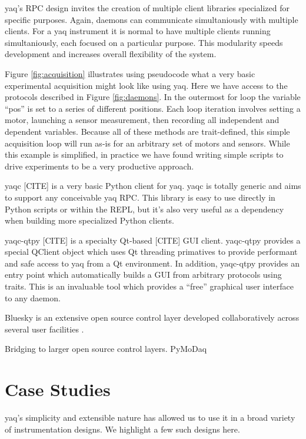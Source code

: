 \documentclass[aip, amsmath, amssymb, reprint,]{revtex4-1}
\begin{document}
yaq's RPC design invites the creation of multiple client libraries specialized for specific purposes.
Again, daemons can communicate simultaniously with multiple clients.
For a yaq instrument it is normal to have multiple clients running simultaniously, each focused on a particular purpose.
This modularity speeds development and increases overall flexibility of the system.

Figure \ref{fig:acquisition} illustrates using pseudocode what a very basic experimental acquisition might look like using yaq.
Here we have access to the protocols described in Figure \ref{fig:daemons}.
In the outermost for loop the variable ``pos'' is set to a series of different positions.
Each loop iteration involves setting a motor, launching a sensor measurement, then recording all independent and dependent variables.
Because all of these methods are trait-defined, this simple acquisition loop will run as-is for an arbitrary set of motors and sensors.
While this example is simplified, in practice we have found writing simple scripts to drive experiments to be a very productive approach.

yaqc [CITE] is a very basic Python client for yaq.
yaqc is totally generic and aims to support any conceivable yaq RPC.
This library is easy to use directly in Python scripts or within the REPL, but it's also very useful as a dependency when building more specialized Python clients.

yaqc-qtpy [CITE] is a specialty Qt-based [CITE] GUI client.
yaqc-qtpy provides a special QClient object which uses Qt threading primatives to provide performant and safe access to yaq from a Qt environment.
In addition, yaqc-qtpy provides an entry point which automatically builds a GUI from arbitrary protocols using traits.
This is an invaluable tool which provides a ``free'' graphical user interface to any daemon.

Bluesky is an extensive open source control layer developed collaboratively across several user facilities \cite{AllanDanielB2019a}.

Bridging to larger open source control layers.
PyMoDaq \cite{WeberSebastien2021a}

\section{Case Studies}

yaq's simplicity and extensible nature has allowed us to use it in a broad variety of instrumentation designs.
We highlight a few such designs here.
\end{document}
